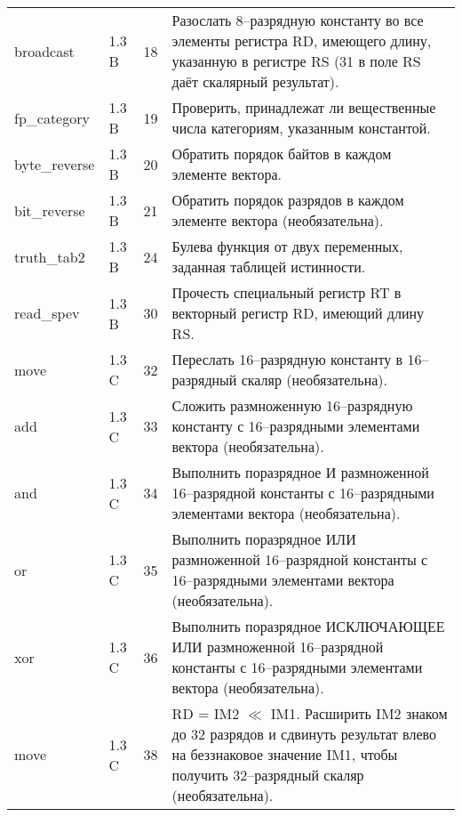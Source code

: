 \documentclass[forwardcom.tex]{subfiles}
\begin{document}
\begin{longtable}{|p{25mm}|p{16mm}|p{9mm}|p{99mm}|}
broadcast        & 1.3 B & 18 & Разослать 8--разрядную константу во все элементы регистра RD, имеющего длину, указанную в регистре RS (31 в поле RS даёт скалярный результат). \\
fp\_category     & 1.3 B & 19 & Проверить, принадлежат ли вещественные числа категориям, указанным  константой. \\
byte\_reverse    & 1.3 B & 20 & Обратить порядок байтов в каждом элементе вектора. \\
bit\_reverse     & 1.3 B & 21 & Обратить порядок разрядов в каждом элементе вектора (необязательна). \\
truth\_tab2      & 1.3 B & 24 & Булева функция от двух переменных, заданная таблицей истинности. \\
read\_spev       & 1.3 B & 30 & Прочесть специальный регистр RT в векторный регистр RD, имеющий длину RS. \\
move             & 1.3 C & 32 & Переслать 16--разрядную константу в 16--разрядный скаляр (необязательна). \\
add              & 1.3 C & 33 & Сложить размноженную 16--разрядную константу с 16--разрядными элементами вектора (необязательна). \\
and              & 1.3 C & 34 & Выполнить поразрядное И размноженной 16--разрядной константы с 16--разрядными элементами вектора (необязательна). \\
or               & 1.3 C & 35 & Выполнить поразрядное ИЛИ размноженной 16--разрядной константы с 16--разрядными элементами вектора (необязательна).  \\
xor              & 1.3 C & 36 & Выполнить поразрядное ИСКЛЮЧАЮЩЕЕ ИЛИ размноженной 16--разрядной константы с 16--разрядными элементами вектора (необязательна). \\
move             & 1.3 C & 38 & RD = IM2 $\ll$ IM1. Расширить IM2 знаком до 32 разрядов и сдвинуть результат влево на беззнаковое значение IM1, чтобы получить 32--разрядный скаляр (необязательна). \\

\end{longtable}
\end{document}
